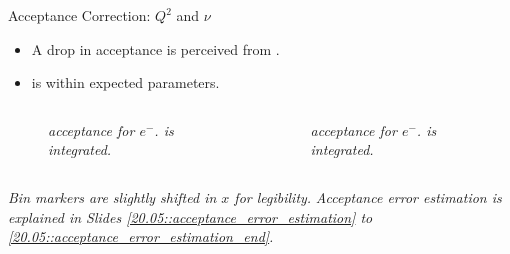 \begin{frame}{Acceptance Correction: $Q^2$ and $\nu$}
    \label{11.52::electron_variables}

    \begin{itemize}
        \item
            A drop in  acceptance is perceived from .

        \item
            \efe{$\nu$} is within expected parameters.
    \end{itemize}

    \vspace{-12pt}
    \begin{columns}[onlytextwidth,T]

    \begin{column}{.49\linewidth}
        \begin{center}
            \begin{figure}[t]
                \scriptsize{\textit{
                     acceptance for $e^-$.
                    \ef{$\nu$} is integrated.
                }}
            \end{figure}
        \end{center}
    \end{column}

    \begin{column}{.49\linewidth}
        \begin{center}
            \begin{figure}[t]
                \scriptsize{\textit{
                    \ef{$\nu$} acceptance for $e^-$.
                     is integrated.
                }}
            \end{figure}
        \end{center}
    \end{column}

    \end{columns}

    \begin{flushright}
        \tiny{\textit{Bin markers are slightly shifted in $x$ for legibility.}}
        \tiny{\textit{Acceptance error estimation is explained in Slides \textcolor{efd_purple}{\ref{20.05::acceptance_error_estimation}} to \textcolor{efd_purple}{\ref{20.05::acceptance_error_estimation_end}}.}}
    \end{flushright}
\end{frame}

